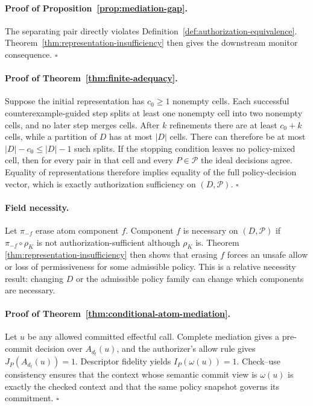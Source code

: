 \documentclass[letterpaper,twocolumn,10pt]{article}
\theoremstyle{definition}
\begin{document}
\paragraph{Proof of Proposition~\ref{prop:mediation-gap}.}
The separating pair directly violates Definition~\ref{def:authorization-equivalence}.
Theorem~\ref{thm:representation-insufficiency} then gives the downstream
monitor consequence. \hfill$\square$

\paragraph{Proof of Theorem~\ref{thm:finite-adequacy}.}
Suppose the initial representation has $c_0\geq 1$ nonempty cells.  Each
successful counterexample-guided step splits at least one nonempty cell into two
nonempty cells, and no later step merges cells.  After $k$ refinements there are
at least $c_0+k$ cells, while a partition of $D$ has at most $|D|$ cells.  There
can therefore be at most $|D|-c_0\leq |D|-1$ such splits.  If the stopping
condition leaves no policy-mixed cell, then for every pair in that cell and
every $P\in\mathcal P$ the ideal decisions agree.  Equality of representations
therefore implies equality of the full policy-decision vector, which is exactly
authorization sufficiency on $(D,\mathcal P)$. \hfill$\square$

\paragraph{Field necessity.}
Let $\pi_{-f}$ erase atom component $f$. Component $f$ is necessary on
$(D,\mathcal{P})$ if $\pi_{-f}\circ\rho_K$ is not
authorization-sufficient although $\rho_K$ is. Theorem
\ref{thm:representation-insufficiency} then shows that erasing $f$ forces an
unsafe allow or loss of permissiveness for some admissible policy. This is a
relative necessity result: changing $D$ or the admissible policy family can
change which components are necessary.

\paragraph{Proof of Theorem~\ref{thm:conditional-atom-mediation}.}
Let $u$ be any allowed committed effectful call.  Complete mediation gives a
pre-commit decision over $A_{d_t}(u)$, and the authorizer's allow rule gives
$J_P(A_{d_t}(u))=1$.  Descriptor fidelity yields $I_P(\omega(u))=1$.
Check--use consistency ensures that the context whose semantic commit view is
$\omega(u)$ is exactly the checked context and that the same policy snapshot
governs its commitment. \hfill$\square$
\end{document}
